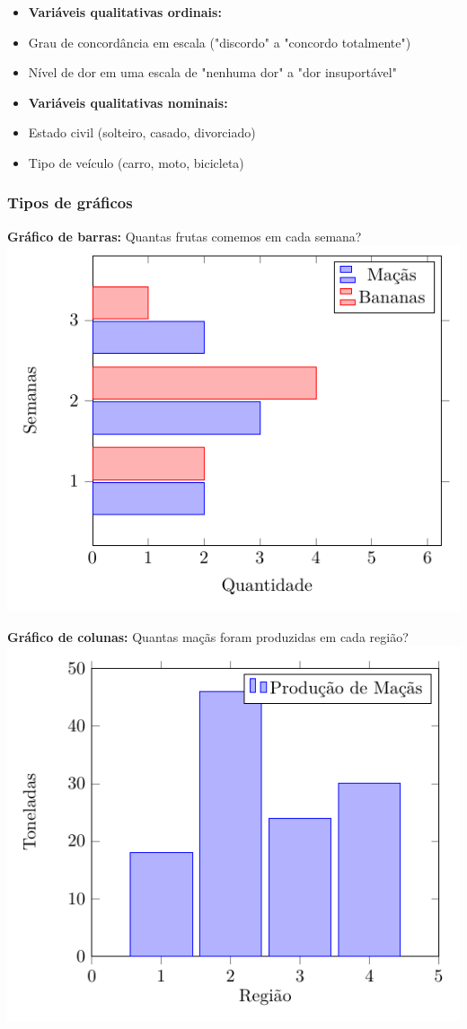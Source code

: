{\begin{itemize}
\item \textbf{Variáveis qualitativas ordinais:}
\item Grau de concordância em escala ("discordo" a "concordo totalmente")
\item Nível de dor em uma escala de "nenhuma dor" a "dor insuportável"

\item \textbf{Variáveis qualitativas nominais:}
\item Estado civil (solteiro, casado, divorciado)
\item Tipo de veículo (carro, moto, bicicleta)
\end{itemize}


\subsubsection{Tipos de gráficos}

{\textbf{Gráfico de barras:} {Quantas frutas comemos em cada semana?}}\\
\medskip\hfill\includegraphics[width=.5\textwidth]{./tikz/barchart.pdf}\hfill\medskip


{\textbf{Gráfico de colunas:} {Quantas maçãs foram produzidas em cada região?}}\\
\medskip\hfill\includegraphics[width=.5\textwidth]{./tikz/columnchart.pdf}\hfill\medskip

}
